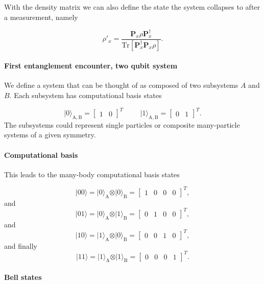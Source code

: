 With the density matrix we can also define the state the system collapses to after a measurement, namely

\[
\rho'_x=\frac{\bm{P}_x\rho\bm{P}_x^{\dagger}}{\mathrm{Tr}[\bm{P}_x^{\dagger}\bm{P}_x\rho]}.
\]


\paragraph{First entanglement encounter, two qubit system}

We define a system that can be thought of as composed of two subsystems
$A$ and $B$. Each subsystem has computational basis states

\[
\vert 0\rangle_{\mathrm{A,B}}=\begin{bmatrix} 1 & 0\end{bmatrix}^T \hspace{1cm} \vert 1\rangle_{\mathrm{A,B}}=\begin{bmatrix} 0 & 1\end{bmatrix}^T.
\]
The subsystems could represent single particles or composite many-particle systems of a given symmetry.


\paragraph{Computational basis}

This leads to the many-body computational basis states

\[
\vert 00\rangle = \vert 0\rangle_{\mathrm{A}}\otimes \vert 0\rangle_{\mathrm{B}}=\begin{bmatrix} 1 & 0 & 0 &0\end{bmatrix}^T,
\]
and
\[
\vert 01\rangle = \vert 0\rangle_{\mathrm{A}}\otimes \vert 1\rangle_{\mathrm{B}}=\begin{bmatrix} 0 & 1 & 0 &0\end{bmatrix}^T,
\]
and
\[
\vert 10\rangle = \vert 1\rangle_{\mathrm{A}}\otimes \vert 0\rangle_{\mathrm{B}}=\begin{bmatrix} 0 & 0 & 1 &0\end{bmatrix}^T,
\]
and finally
\[
\vert 11\rangle = \vert 1\rangle_{\mathrm{A}}\otimes \vert 1\rangle_{\mathrm{B}}=\begin{bmatrix} 0 & 0 & 0 &1\end{bmatrix}^T.
\]


\paragraph{Bell states}

